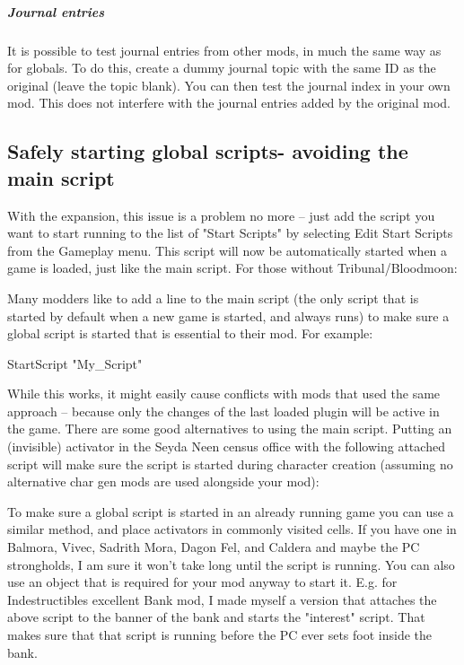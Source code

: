 \documentclass[
]{article}
\begin{document}
\hypertarget{journal-entries}{%
\subparagraph{Journal entries}\label{journal-entries}}

It is possible to test journal entries from other mods, in much the same
way as for globals. To do this, create a dummy journal topic with the
same ID as the original (leave the topic blank). You can then test the
journal index in your own mod. This does not interfere with the journal
entries added by the original mod.

\hypertarget{safely-starting-global-scripts--avoiding-the-main-script}{%
\subsection{\texorpdfstring{\hfill\break
Safely starting global scripts- avoiding the main
script}{ Safely starting global scripts- avoiding the main script}}\label{safely-starting-global-scripts--avoiding-the-main-script}}

With the expansion, this issue is a problem no more -- just add the
script you want to start running to the list of "Start Scripts" by
selecting Edit Start Scripts from the Gameplay menu. This script will
now be automatically started when a game is loaded, just like the main
script. For those without Tribunal/Bloodmoon:

Many modders like to add a line to the main script (the only script that
is started by default when a new game is started, and always runs) to
make sure a global script is started that is essential to their mod. For
example:

StartScript "My\_Script"

While this works, it might easily cause conflicts with mods that used
the same approach -- because only the changes of the last loaded plugin
will be active in the game. There are some good alternatives to using
the main script. Putting an (invisible) activator in the Seyda Neen
census office with the following attached script will make sure the
script is started during character creation (assuming no alternative
char gen mods are used alongside your mod):



To make sure a global script is started in an already running game you
can use a similar method, and place activators in commonly visited
cells. If you have one in Balmora, Vivec, Sadrith Mora, Dagon Fel, and
Caldera and maybe the PC strongholds, I am sure it won't take long until
the script is running. You can also use an object that is required for
your mod anyway to start it. E.g. for Indestructibles excellent Bank
mod, I made myself a version that attaches the above script to the
banner of the bank and starts the "interest" script. That makes sure
that that script is running before the PC ever sets foot inside the
bank.
\end{document}
